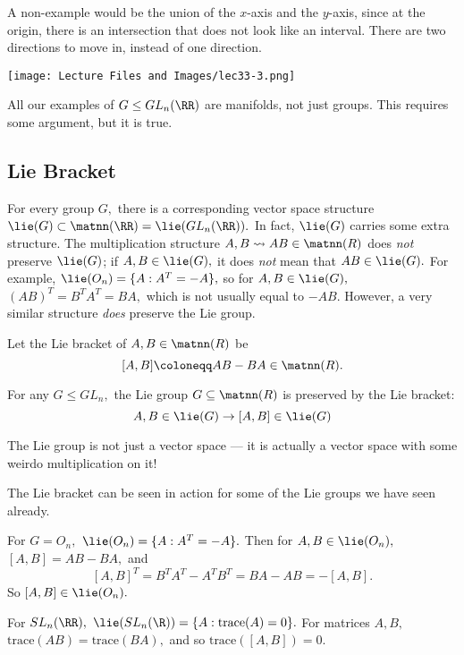 A non-example would be the union of the $x$-axis and the $y$-axis, since at the origin, there is an intersection that does not look like an interval. There are two directions to move in, instead of one direction. 

\begin{center}
    \texttt{[image: Lecture Files and Images/lec33-3.png]}
\end{center}


All our examples of $G \leq GL_n(\RR)$ are manifolds, not just groups. This requires some argument, but it is true. 

\subsection{Lie Bracket}

For every group $G,$ there is a corresponding vector space structure $\lie(G) \subset \matnn(\RR) = \lie(GL_n(\RR)).$ In fact, $\lie(G)$ carries some extra structure. The multiplication structure $A, B \rightsquigarrow AB \in \matnn(R)$ does \emph{not} preserve $\lie(G)$; if $A, B \in \lie(G),$ it does \emph{not} mean that $AB \in \lie(G).$ For example, $\lie(O_n) = \{A: A^T = -A\},$ so for $A, B \in \lie(G),$ $(AB)^T = B^TA^T = BA,$ which is not usually equal to $-AB.$ However, a very similar structure \emph{does} preserve the Lie group.

\begin{definition}
Let the Lie bracket of $A, B \in \matnn(R)$ be \[[A, B] \coloneqq AB - BA \in \matnn(R).\]
\end{definition}


\begin{theorem}
For any $G \leq GL_n,$ the Lie group $G \subseteq \matnn(R)$ is preserved by the Lie bracket:
\[
A, B \in \lie(G) \rightarrow [A, B] \in \lie(G) %
\]
\end{theorem}

The Lie group is not just a vector space --- it is actually a vector space with some weirdo multiplication on it!

The Lie bracket can be seen in action for some of the Lie groups we have seen already.
\begin{example}
For $G = O_n,$ $\lie(O_n) = \{A: A^T = -A\}.$ Then for $A, B \in \lie(O_n),$ $[A, B] = AB - BA,$ and
\[
[A, B]^T = B^TA^T -A^TB^T = BA -AB = -[A, B].
\]
So $[A, B] \in \lie(O_n).$
\end{example}
\begin{example}
For $SL_n(\RR),$ $\lie(SL_n(\R)) = \{A: \text{trace}(A) = 0\}.$ For matrices $A, B,$ $\text{trace}(AB) = \text{trace}(BA),$ and so $\text{trace}([A, B]) = 0.$ %
\end{example}


